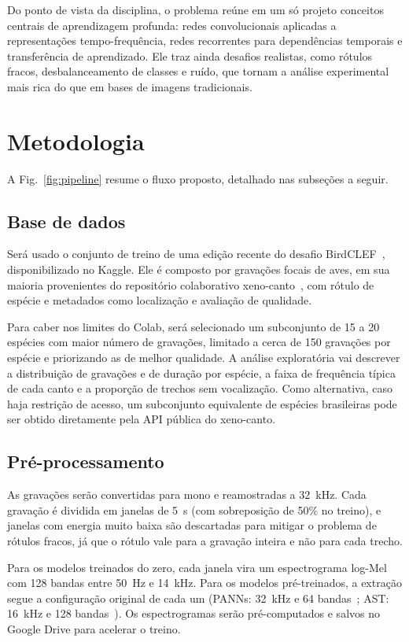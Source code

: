 \documentclass[conference]{IEEEtran}
\begin{document}
Do ponto de vista da disciplina, o problema reúne em um só projeto conceitos centrais de aprendizagem profunda: redes convolucionais aplicadas a representações tempo-frequência, redes recorrentes para dependências temporais e transferência de aprendizado. Ele traz ainda desafios realistas, como rótulos fracos, desbalanceamento de classes e ruído, que tornam a análise experimental mais rica do que em bases de imagens tradicionais.

\section{Metodologia}

A Fig.~\ref{fig:pipeline} resume o fluxo proposto, detalhado nas subseções a seguir.


\subsection{Base de dados}
Será usado o conjunto de treino de uma edição recente do desafio BirdCLEF~\cite{kahl2021birdclef}, disponibilizado no Kaggle. Ele é composto por gravações focais de aves, em sua maioria provenientes do repositório colaborativo xeno-canto~\cite{xenocanto}, com rótulo de espécie e metadados como localização e avaliação de qualidade.

Para caber nos limites do Colab, será selecionado um subconjunto de 15 a 20 espécies com maior número de gravações, limitado a cerca de 150 gravações por espécie e priorizando as de melhor qualidade. A análise exploratória vai descrever a distribuição de gravações e de duração por espécie, a faixa de frequência típica de cada canto e a proporção de trechos sem vocalização. Como alternativa, caso haja restrição de acesso, um subconjunto equivalente de espécies brasileiras pode ser obtido diretamente pela API pública do xeno-canto.

\subsection{Pré-processamento}
As gravações serão convertidas para mono e reamostradas a 32~kHz. Cada gravação é dividida em janelas de 5~s (com sobreposição de 50\% no treino), e janelas com energia muito baixa são descartadas para mitigar o problema de rótulos fracos, já que o rótulo vale para a gravação inteira e não para cada trecho.

Para os modelos treinados do zero, cada janela vira um espectrograma log-Mel com 128 bandas entre 50~Hz e 14~kHz. Para os modelos pré-treinados, a extração segue a configuração original de cada um (PANNs: 32~kHz e 64 bandas~\cite{kong2020panns}; AST: 16~kHz e 128 bandas~\cite{gong2021ast}). Os espectrogramas serão pré-computados e salvos no Google Drive para acelerar o treino.
\end{document}
